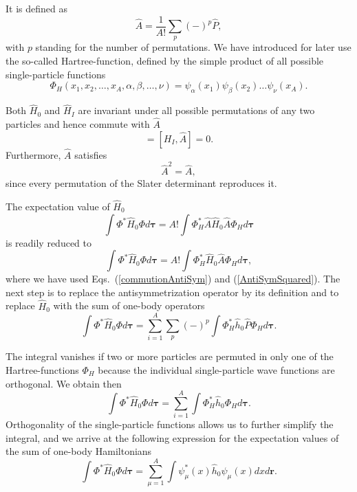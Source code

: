\documentclass[graybox,sectrefs,envcountresetchap,open=right]{svmonodo}
\begin{document}
It is defined as
\begin{equation}
  \hat{A} = \frac{1}{A!}\sum_{p} (-)^p\hat{P},
\label{antiSymmetryOperator}
\end{equation}
with $p$ standing for the number of permutations. We have introduced for later use the so-called
Hartree-function, defined by the simple product of all possible single-particle functions
\[
  \Phi_H(x_1,x_2,\dots,x_A,\alpha,\beta,\dots,\nu) =
  \psi_{\alpha}(x_1)
    \psi_{\beta}(x_2)\dots\psi_{\nu}(x_A).
\]



Both $\hat{H}_0$ and $\hat{H}_I$ are invariant under all possible permutations of any two particles
and hence commute with $\hat{A}$
\begin{equation}
  [H_0,\hat{A}] = [H_I,\hat{A}] = 0. \label{commutionAntiSym}
\end{equation}
Furthermore, $\hat{A}$ satisfies
\begin{equation}
  \hat{A}^2 = \hat{A},  \label{AntiSymSquared}
\end{equation}
since every permutation of the Slater
determinant reproduces it. 




The expectation value of $\hat{H}_0$ 
\[
  \int \Phi^*\hat{H}_0\Phi d\mathbf{\tau} 
  = A! \int \Phi_H^*\hat{A}\hat{H}_0\hat{A}\Phi_H d\mathbf{\tau}
\]
is readily reduced to
\[
  \int \Phi^*\hat{H}_0\Phi d\mathbf{\tau} 
  = A! \int \Phi_H^*\hat{H}_0\hat{A}\Phi_H d\mathbf{\tau},
\]
where we have used Eqs.~(\ref{commutionAntiSym}) and
(\ref{AntiSymSquared}). The next step is to replace the antisymmetrization
operator by its definition and to
replace $\hat{H}_0$ with the sum of one-body operators
\[
  \int \Phi^*\hat{H}_0\Phi  d\mathbf{\tau}
  = \sum_{i=1}^A \sum_{p} (-)^p\int 
  \Phi_H^*\hat{h}_0\hat{P}\Phi_H d\mathbf{\tau}.
\]



The integral vanishes if two or more particles are permuted in only one
of the Hartree-functions $\Phi_H$ because the individual single-particle wave functions are
orthogonal. We obtain then
\[
  \int \Phi^*\hat{H}_0\Phi  d\mathbf{\tau}= \sum_{i=1}^A \int \Phi_H^*\hat{h}_0\Phi_H  d\mathbf{\tau}.
\]
Orthogonality of the single-particle functions allows us to further simplify the integral, and we
arrive at the following expression for the expectation values of the
sum of one-body Hamiltonians 
\begin{equation}
  \int \Phi^*\hat{H}_0\Phi  d\mathbf{\tau}
  = \sum_{\mu=1}^A \int \psi_{\mu}^*(x)\hat{h}_0\psi_{\mu}(x)dx
  d\mathbf{r}.
  \label{H1Expectation}
\end{equation}
\end{document}
